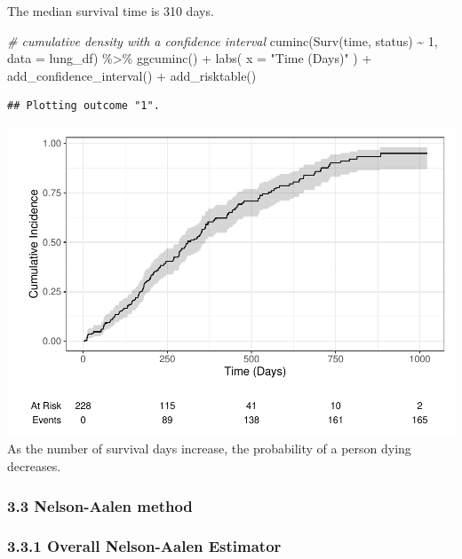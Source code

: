 \documentclass[
]{article}
\newenvironment{Shaded}{\begin{snugshade}}{\end{snugshade}}
\newcommand{\AttributeTok}[1]{\textcolor[rgb]{0.77,0.63,0.00}{#1}}
\newcommand{\CommentTok}[1]{\textcolor[rgb]{0.56,0.35,0.01}{\textit{#1}}}
\newcommand{\DecValTok}[1]{\textcolor[rgb]{0.00,0.00,0.81}{#1}}
\newcommand{\FunctionTok}[1]{\textcolor[rgb]{0.00,0.00,0.00}{#1}}
\newcommand{\NormalTok}[1]{#1}
\newcommand{\SpecialCharTok}[1]{\textcolor[rgb]{0.00,0.00,0.00}{#1}}
\newcommand{\StringTok}[1]{\textcolor[rgb]{0.31,0.60,0.02}{#1}}
\begin{document}
The median survival time is 310 days.

\begin{Shaded}
\begin{Highlighting}[]
\CommentTok{\# cumulative density with a confidence interval}
\FunctionTok{cuminc}\NormalTok{(}\FunctionTok{Surv}\NormalTok{(time, status) }\SpecialCharTok{\textasciitilde{}} \DecValTok{1}\NormalTok{, }\AttributeTok{data =}\NormalTok{ lung\_df) }\SpecialCharTok{\%\textgreater{}\%} 
  \FunctionTok{ggcuminc}\NormalTok{() }\SpecialCharTok{+} 
  \FunctionTok{labs}\NormalTok{(}
    \AttributeTok{x =} \StringTok{"Time (Days)"}
\NormalTok{  ) }\SpecialCharTok{+} 
  \FunctionTok{add\_confidence\_interval}\NormalTok{() }\SpecialCharTok{+}
  \FunctionTok{add\_risktable}\NormalTok{()}
\end{Highlighting}
\end{Shaded}

\begin{verbatim}
## Plotting outcome "1".
\end{verbatim}

\includegraphics{final_project_files/figure-latex/unnamed-chunk-11-1.pdf}
As the number of survival days increase, the probability of a person
dying decreases.

\hypertarget{nelson-aalen-method}{%
\subsubsection{3.3 Nelson-Aalen method}\label{nelson-aalen-method}}

\hypertarget{overall-nelson-aalen-estimator}{%
\subsubsection{3.3.1 Overall Nelson-Aalen
Estimator}\label{overall-nelson-aalen-estimator}}
\end{document}
